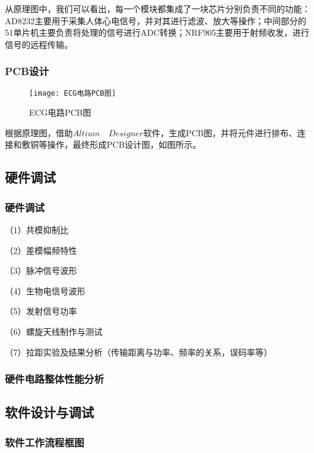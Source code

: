 \documentclass{zjureport}
\begin{document}
	从原理图中，我们可以看出，每一个模块都集成了一块芯片分别负责不同的功能：AD8232主要用于采集人体心电信号，并对其进行滤波、放大等操作；中间部分的51单片机主要负责将处理的信号进行ADC转换；NRF905主要用于射频收发，进行信号的远程传输。
	
	\subsubsection{PCB设计}
	
	\begin{figure}[H]
		\centering%
		\texttt{[image: ECG电路PCB图]}
		\caption{ECG电路PCB图}%
		\label{ECG电路PCB图}%
	\end{figure}
	
	根据原理图，借助$Altium \quad Designer$软件，生成PCB图，并将元件进行排布、连接和敷铜等操作，最终形成PCB设计图，如图所示。
	
	\subsection{硬件调试}
	
	\subsubsection{硬件调试}
	
	（1）共模抑制比
	
	（2）差模幅频特性
	
	（3）脉冲信号波形
	
	（4）生物电信号波形
	
	（5）发射信号功率
	
	（6）螺旋天线制作与测试
	
	（7）拉距实验及结果分析（传输距离与功率、频率的关系，误码率等）
	
	\subsubsection{硬件电路整体性能分析}
	
	\subsection{软件设计与调试}
	
	\subsubsection{软件工作流程框图}
	
\end{document}
